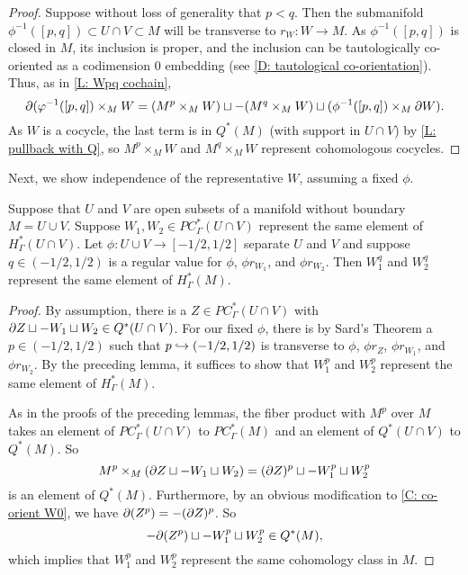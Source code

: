 \begin{proof}
	Suppose without loss of generality that $p<q$.
	Then the submanifold $\phi^{-1}([p,q]) \subset U \cap V \subset M$ will be transverse to $r_W \colon W \to M$.
	As $\phi^{-1}([p,q])$ is closed in $M$, its inclusion is proper, and the inclusion can be tautologically co-oriented as a codimension $0$ embedding (see \cref{D: tautological co-orientation}).
	Thus, as in \cref{L: Wpq cochain}, $$\partial(\varphi^{-1}([p,q])\times_{M} W = (M^p \times_{M} W)\sqcup -(M^q \times_{M} W) \sqcup (\phi^{-1}([p,q])\times_{M} \partial W).$$
	As $W$ is a cocycle, the last term is in $Q^*(M)$ (with support in $U \cap V$) by \cref{L: pullback with Q}, so $M^p \times_{M} W$ and $M^q \times_{M} W$ represent cohomologous cocycles.
\end{proof}

Next, we show independence of the representative $W$, assuming a fixed $\phi$.

\begin{lemma}\label{L: different W}
	Suppose that $U$ and $V$ are open subsets of a manifold without boundary $M = U \cup V$.
	Suppose $W_1, W_2 \in PC^*_\Gamma(U \cap V)$ represent the same element of $H^*_\Gamma(U \cap V)$.
	Let $\phi \colon U \cup V \to [-1/2,1/2]$ separate $U$ and $V$ and suppose $q \in (-1/2,1/2)$ is a regular value for $\phi$, $\phi r_{W_1}$, and $\phi r_{W_2}$.
	Then $W_1^q$ and $W_2^q$ represent the same element of $H^*_\Gamma(M)$.
\end{lemma}

\begin{proof}
	By assumption, there is a $Z \in PC^*_{\Gamma}(U \cap V)$ with $\partial Z \sqcup -W_1 \sqcup W_2 \in Q^*(U \cap V)$.
	For our fixed $\phi$, there is by Sard's Theorem a $p \in (-1/2,1/2)$ such that $p \hookrightarrow (-1/2,1/2)$ is transverse to $\phi$, $\phi r_Z$, $\phi r_{W_1}$, and $\phi r_{W_2}$.
	By the preceding lemma, it suffices to show that $W_1^p$ and $W_2^p$ represent the same element of $H^*_\Gamma(M)$.

	As in the proofs of the preceding lemmas, the fiber product with $M^p$ over $M$ takes an element of $PC^*_\Gamma(U \cap V)$ to $PC^*_\Gamma(M)$ and an element of $Q^*(U \cap V)$ to $Q^*(M)$.
	So
	$$M^p \times_{M}(\partial Z \sqcup -W_1 \sqcup W_2) = (\partial Z)^p \sqcup -W_1^p \sqcup W_2^p$$
	is an element of $Q^*(M)$.
	Furthermore, by an obvious modification to \cref{C: co-orient W0}, we have $\partial (Z^p) = -(\partial Z)^p$.
	So  $$-\partial (Z^p) \sqcup -W_1^p \sqcup W_2^p \in Q^*(M),$$
	which implies that $W_1^p$ and $W_2^p$ represent the same cohomology class in $M$.
\end{proof}

